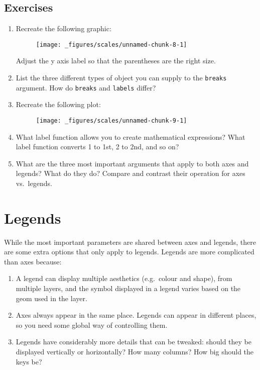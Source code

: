 \hypertarget{exercises-1}{%
\subsection{Exercises}\label{exercises-1}}

\begin{enumerate}
\def\labelenumi{\arabic{enumi}.}
\item
  Recreate the following graphic:

  \begin{figure}[H]
    \texttt{[image: \_figures/scales/unnamed-chunk-8-1]}
  \end{figure}

  Adjust the y axis label so that the parentheses are the right size.
\item
  List the three different types of object you can supply to the
  \texttt{breaks} argument. How do \texttt{breaks} and \texttt{labels}
  differ?
\item
  Recreate the following plot:

  \begin{figure}[H]
    \texttt{[image: \_figures/scales/unnamed-chunk-9-1]}
  \end{figure}
\item
  What label function allows you to create mathematical expressions?
  What label function converts 1 to 1st, 2 to 2nd, and so on?
\item
  What are the three most important arguments that apply to both axes
  and legends? What do they do? Compare and contrast their operation for
  axes vs.~legends.
\end{enumerate}

\hypertarget{sec:legends}{%
\section{Legends}\label{sec:legends}}

While the most important parameters are shared between axes and legends,
there are some extra options that only apply to legends. Legends are
more complicated than axes because: 

\begin{enumerate}
\def\labelenumi{\arabic{enumi}.}
\item
  A legend can display multiple aesthetics (e.g.~colour and shape), from
  multiple layers, and the symbol displayed in a legend varies based on
  the geom used in the layer.
\item
  Axes always appear in the same place. Legends can appear in different
  places, so you need some global way of controlling them.
\item
  Legends have considerably more details that can be tweaked: should
  they be displayed vertically or horizontally? How many columns? How
  big should the keys be?
\end{enumerate}

